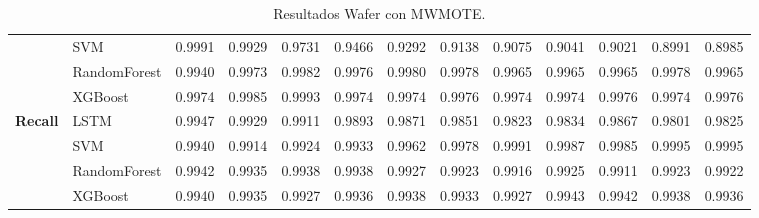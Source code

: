 \begin{table}[h]
\begin{adjustbox}{max width=15cm}
\begin{tabular}{|c|l|r|r|r|r|r|r|r|r|r|r|r|}
			& SVM &  0.9991 &  0.9929 &  0.9731 &  0.9466 &  0.9292 &  0.9138 &  0.9075 &  0.9041 &  0.9021 &  0.8991 &  0.8985 \\
			& RandomForest &  0.9940 &  0.9973 &  0.9982 &  0.9976 &  0.9980 &  0.9978 &  0.9965 &  0.9965 &  0.9965 &  0.9978 &  0.9965 \\
			& XGBoost &  0.9974 &  0.9985 &  0.9993 &  0.9974 &  0.9974 &  0.9976 &  0.9974 &  0.9974 &  0.9976 &  0.9974 &  0.9976 \\
			\hline
			\textbf{Recall} & LSTM &  0.9947 &  0.9929 &  0.9911 &  0.9893 &  0.9871 &  0.9851 &  0.9823 &  0.9834 &  0.9867 &  0.9801 &  0.9825 \\
			& SVM &  0.9940 &  0.9914 &  0.9924 &  0.9933 &  0.9962 &  0.9978 &  0.9991 &  0.9987 &  0.9985 &  0.9995 &  0.9995 \\
			& RandomForest &  0.9942 &  0.9935 &  0.9938 &  0.9938 &  0.9927 &  0.9923 &  0.9916 &  0.9925 &  0.9911 &  0.9923 &  0.9922 \\
			& XGBoost &  0.9940 &  0.9935 &  0.9927 &  0.9936 &  0.9938 &  0.9933 &  0.9927 &  0.9943 &  0.9942 &  0.9938 &  0.9936 \\
			\hline
		\end{tabular}
	\end{adjustbox}
	\caption{Resultados Wafer con MWMOTE.}
	\label{tab:Wafer_MWMOTE}
\end{table}
\newpage

